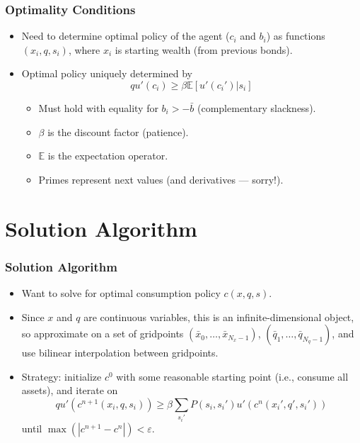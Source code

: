 \documentclass[handout]{beamer}
\newcommand{\E}{\mathbb{E}}
\newcommand{\eps}{\varepsilon}
\theoremstyle{definition}
\begin{document}
\begin{frame}
  \frametitle{Optimality Conditions}
  \begin{itemize}[<+->]
  \item Need to determine optimal policy of the agent ($c_i$ and $b_i$) as functions $(x_i, q, s_i)$, where $x_i$ is starting wealth (from previous bonds).
  \item Optimal policy uniquely determined by
    \begin{equation*}
      q u'(c_i) \ge \beta \E \left[ u'(c_i') | s_i \right]
    \end{equation*}
    \begin{itemize}[<+->]
    \item Must hold with equality for $b_i > -\bar{b}$ (complementary slackness).
    \item $\beta$ is the discount factor (patience).
    \item $\E$ is the expectation operator.
    \item Primes represent next values (and derivatives --- sorry!).
    \end{itemize}
  \end{itemize}
\end{frame}

\section{Solution Algorithm}

\begin{frame}
  \frametitle{Solution Algorithm}
  \begin{itemize}[<+->]
  \item Want to solve for optimal consumption policy $c(x, q, s)$.
  \item Since $x$ and $q$ are continuous variables, this is an infinite-dimensional object, so approximate on a set of gridpoints $(\bar{x}_0, \ldots, \bar{x}_{N_x-1})$, $(\bar{q}_1, \ldots, \bar{q}_{N_q-1})$, and use bilinear interpolation between gridpoints.
  \item Strategy: initialize $c^0$ with some reasonable starting point (i.e., consume all assets), and iterate on
    \begin{equation}
      \label{eq:foc}
      q u'(c^{n+1}(x_i, q, s_i)) \ge \beta \sum_{s_i'} P(s_i, s_i') u'(c^n(x_i', q', s_i'))
    \end{equation}
    until $\max( | c^{n+1} - c^n | ) < \eps$.
  \end{itemize}
\end{frame}
\end{document}
